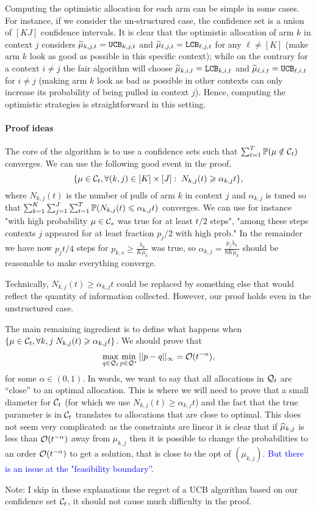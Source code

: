 \begin{remark}
	Computing the optimistic allocation for each arm can be simple in some cases. For instance, if we consider the un-structured case, the confidence set is a union of $[KJ]$ confidence intervals. It is clear that the optimistic allocation of arm $k$ in context $j$ considers $\widetilde{\mu}_{k,j,t}=\texttt{UCB}_{k,j,t}$ and $\widetilde{\mu}_{\ell, j, t}=\texttt{LCB}_{\ell, j, t}$ for any $\ell \neq [K]$ (make arm $k$ look as good as possible in this specific context); while on the contrary for a context $i\neq j$ the fair algorithm will choose $\widetilde{\mu}_{k,i,t}=\texttt{LCB}_{k,i,t}$ and $\widetilde{\mu}_{\ell, i, t}=\texttt{UCB}_{\ell, i, t}$ for $i\neq j$ (making arm $k$ look as bad as possible in other contexts can only increase its probability of being pulled in context $j$). Hence, computing the optimistic strategies is straightforward in this setting.
\end{remark}


\paragraph{Proof ideas} The core of the algorithm is to use a confidence sets such that $\sum_{t=1}^T \mathbb{P}(\mu \notin \mathcal{C}_t)$ converges. We can use the following good event in the proof, \[\{\mu \in \mathcal{C}_t, \forall (k,j) \in [K]\times [J]: \; N_{k,j}(t)  \geqslant \alpha_{k,j} t \},\] where $N_{k,j}(t)$ is the number of pulls of arm $k$ in context $j$ and $\alpha_{k, j}$ is tuned so that $\sum_{k=1}^K \sum_{j=1}^J \sum_{t=1}^T \mathbb{P}(N_{k,j}(t)\leqslant \alpha_{k,j}t)$ converges. We can use for instance "with high probability $\mu\in \mathcal{C}_s$ was true for at least $t/2$ steps", "among these steps contexts $j$ appeared for at least fraction $p_j/2$ with high prob." In the remainder we have now $p_jt/4$ steps for $p_{k,s}\geq \frac{\lambda_k}{K\mu_k}$ was true, so  $\alpha_{k,j}= \frac{p_j\lambda_k}{8K\mu_k}$ should be reasonable to make everything converge.

Technically, $N_{k,j}(t)\geq \alpha_{k,j}t$ could be replaced by something else that would reflect the quantity of information collected. However, our proof holds even in the unstructured case.

The main remaining ingredient is to define what happens when $\{\mu \in \mathcal{C}_t, \forall k,j \; N_{k,j}(t)  \geqslant \alpha_{k,j} t\}$. We should prove that 
\[\max_{q \in \mathcal{Q}_t} \min_{p \in \mathcal{Q}^\star} ||p-q ||_\infty = \mathcal{O}(t^{-\alpha}), \]
for some $\alpha \in (0, 1)$. In words, we want to say that all allocations in $\mathcal{Q}_t$ are ``close'' to an optimal allocation. This is where we will need to prove that a small diameter for $\mathcal{C}_t$ (for which we use $N_{k,j}(t)  \geq \alpha_{k,j} t$) and the fact that the true parameter is in $\mathcal{C}_t$ translates to allocations that are close to optimal. This does not seem very complicated: as the constraints are linear it is clear that if $\widehat{\mu}_{k,j}$ is less than $\mathcal{O}(t^{-\alpha})$ away from $\mu_{k, j}$ then it is possible to change the probabilities to an order $\mathcal{O}(t^{-\alpha})$ to get a solution, that is close to the opt of $(\mu_{k,j})$. \textcolor{blue}{But there is an issue at the "feasibility boundary''.}

Note: I skip in these explanations the regret of a UCB algorithm based on our confidence set $\mathcal{C}_t$, it should not cause much difficulty in the proof.



